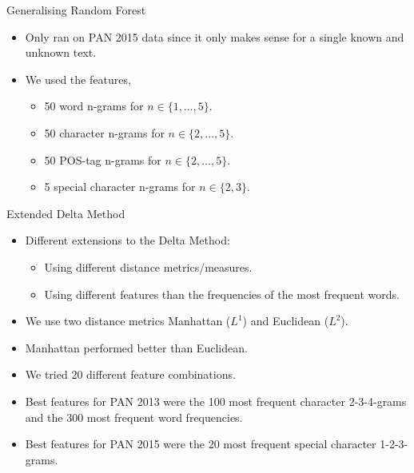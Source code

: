 \documentclass[10pt]{beamer}
\begin{document}
\begin{frame}[fragile]{Generalising Random Forest}

    \begin{itemize}
        \item Only ran on PAN 2015 data since it only makes sense for a single
            known and unknown text.
        \item We used the features,
            \begin{itemize}
                \item 50 word n-grams for $n \in \{1, \dots, 5\}$.
                \item 50 character n-grams for $n \in \{2, \dots, 5\}$.
                \item 50 POS-tag n-grams for $n \in \{2, \dots, 5\}$.
                \item 5 special character n-grams for $n \in \{2, 3\}$.
            \end{itemize}
    \end{itemize}

\end{frame}

\begin{frame}[fragile]{Extended Delta Method}

    \begin{itemize}
        \item Different extensions to the Delta Method:
            \begin{itemize}
                \item Using different distance metrics/measures.
                \item Using different features than the frequencies of the most
                    frequent words.
            \end{itemize}
        \item We use two distance metrics Manhattan ($L^1$) and Euclidean
            ($L^2$).
        \item Manhattan performed better than Euclidean.
        \item We tried 20 different feature combinations.
        \item Best features for PAN 2013 were the 100 most frequent character
            2-3-4-grams and the 300 most frequent word frequencies.
        \item Best features for PAN 2015 were the 20 most frequent special
            character 1-2-3-grams.
    \end{itemize}

\end{frame}
\end{document}

